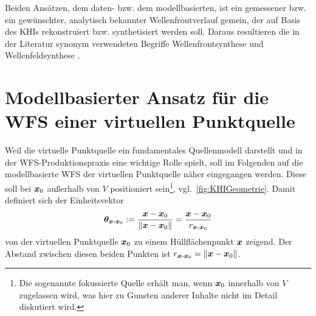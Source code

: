 Beiden Ansätzen, dem daten- bzw. dem modellbasierten, ist ein gemessener bzw.
ein gewünschter, analytisch bekannter Wellenfrontverlauf gemein, der auf Basis
des KHIs rekonstruiert bzw. synthetisiert werden soll.
%
Daraus resultieren die in der Literatur synonym verwendeten Begriffe
Wellenfrontsynthese und
Wellenfeldsynthese \cite{Berkhout1992b,Berkhout1992a}.



\section{Modellbasierter Ansatz für die WFS einer virtuellen Punktquelle}
\label{sec:WFS_PointSource}
%
Weil die virtuelle Punktquelle ein fundamentales Quellenmodell darstellt und in
der WFS-Produktionspraxis eine wichtige Rolle spielt, soll im Folgenden
auf die modellbasierte WFS der virtuellen Punktquelle näher eingegangen werden.
%
Diese soll bei $\bm{x}_\mathrm{0}$ außerhalb von $V$ positioniert sein\footnote{Die sogenannte
fokussierte Quelle erhält man, wenn $\bm{x}_\mathrm{0}$ innerhalb von $V$ zugelassen wird,
was hier zu Gunsten anderer Inhalte nicht im Detail diskutiert wird.},
vgl.~\Abb\ref{fig:KHIGeometrie}.
%
Damit definiert sich der Einheitsvektor
\begin{align}
\bm{\theta}_{\bm{x}\text{-}\bm{x}_\mathrm{0}} :=
\frac{\bm{x}-\bm{x}_\mathrm{0}}{\|\bm{x}-\bm{x}_\mathrm{0}\|} =
\frac{\bm{x}-\bm{x}_\mathrm{0}}{r_{\bm{x}\text{-}\bm{x}_\mathrm{0}}}
\end{align}
von der virtuellen Punktquelle $\bm{x}_\mathrm{0}$ zu einem Hüllflächenpunkt
$\bm{x}$ zeigend.
%
Der Abstand zwischen diesen beiden Punkten ist
$r_{\bm{x}\text{-}\bm{x}_\mathrm{0}}=\|\bm{x}-\bm{x}_\mathrm{0}\|$.



